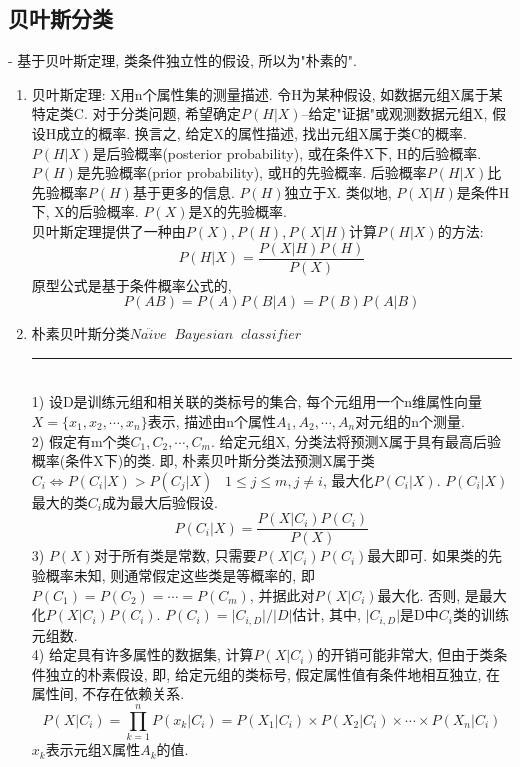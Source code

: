 \documentclass[a4paper,10pt,english]{article}
\begin{document}
\subsection{贝叶斯分类}
\begin{description}
\item {-}
\small{
基于贝叶斯定理, 类条件独立性的假设, 所以为"朴素的".
}
\end{description}
\begin{enumerate}
\item {贝叶斯定理:}
X用n个属性集的测量描述. 令H为某种假设, 如数据元组X属于某特定类C. 对于分类问题, 希望确定$P(H|X)$--给定"证据"或观测数据元组X, 假设H成立的概率. 换言之, 给定X的属性描述, 找出元组X属于类C的概率.\\
$P(H|X)$是后验概率(posterior probability), 或在条件X下, H的后验概率. $P(H)$是先验概率(prior probability), 或H的先验概率. 后验概率$P(H|X)$比先验概率$P(H)$基于更多的信息. $P(H)$独立于X. 类似地, $P(X|H)$是条件H下, X的后验概率. $P(X)$是X的先验概率. \\
贝叶斯定理提供了一种由$P(X), P(H), P(X|H)$计算$P(H|X)$的方法: $$ P(H|X) = \frac{P(X|H)P(H)}{P(X)}$$
原型公式是基于条件概率公式的, $$ P(AB) = P(A)P(B|A) = P(B)P(A|B) $$
\item {朴素贝叶斯分类$Na\ddot{i}ve \;\; Bayesian \;\; classifier$}\\
\rule{15cm}{1pt} \\
1) 设D是训练元组和相关联的类标号的集合, 每个元组用一个n维属性向量$ X = \{x_1, x_2, \cdots, x_n\}$表示, 描述由n个属性$A_1, A_2, \cdots, A_n$对元组的n个测量. \\
2) 假定有m个类$C_1, C_2, \cdots, C_m$. 给定元组X, 分类法将预测X属于具有最高后验概率(条件X下)的类. 即, 朴素贝叶斯分类法预测X属于类$C_i \Leftrightarrow P(C_i|X) > P(C_j|X) \;\;\;  1 \leq j \leq m, j \neq i $, 最大化$P(C_i|X)$. $P(C_i|X)$最大的类$C_i$成为最大后验假设. $$P(C_i|X) = \frac{P(X|C_i)P(C_i)}{P(X)} $$
3) $P(X)$对于所有类是常数, 只需要$P(X|C_i)P(C_i)$最大即可. 如果类的先验概率未知, 则通常假定这些类是等概率的, 即$ P(C_1) = P(C_2) = \cdots = P(C_m)$, 并据此对$P(X|C_i)$最大化. 否则, 是最大化$P(X|C_i)P(C_i)$. $P(C_i) = \lvert C_{i,D} \rvert/\lvert D \rvert$估计, 其中, $\lvert C_{i,D} \rvert$是D中$C_i$类的训练元组数. \\
4) 给定具有许多属性的数据集, 计算$P(X|C_i)$的开销可能非常大, 但由于类条件独立的朴素假设, 即, 给定元组的类标号, 假定属性值有条件地相互独立, 在属性间, 不存在依赖关系. 
$$ P(X|C_i) = \prod_{k=1}^nP(x_k|C_i) = P(X_1|C_i) \times P(X_2|C_i) \times \cdots \times P(X_n|C_i)  $$
$x_k$表示元组X属性$A_k$的值. 
\begin{enumerate}

\end{enumerate}
\end{enumerate}
\end{document}

